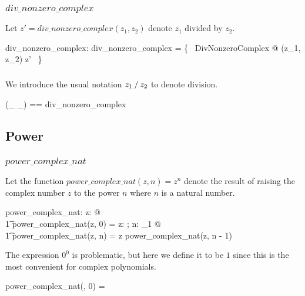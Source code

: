 \documentclass[11pt, oneside]{article}
\begin{document}
\subsubsection{$div\_nonzero\_complex$}

Let $z' = div\_nonzero\_complex(z_1, z_2)$ denote $z_1$ divided by $z_2$.

\begin{axdef}
	div\_nonzero\_complex: \C \cross \Cnz \fun \C
\where
	div\_nonzero\_complex = \{~ DivNonzeroComplex @ (z_1, z_2) \mapsto z' ~\}
\end{axdef}

\subsubsection{}

We introduce the usual notation $z_1 \mathbin{/} z_2$ to denote division.

\begin{zed}
	(\_ \divCnz \_) == div\_nonzero\_complex
\end{zed}

\subsection{Power}

\subsubsection{$power\_complex\_nat$}

Let the function $power\_complex\_nat(z,n) = z^n$ denote the result of raising the complex number $z$
to the power $n$ where $n$ is a natural number.

\begin{axdef}
	power\_complex\_nat: \C \cross \nat \fun \C
\where
	\forall z: \C @ \\
	\t1	power\_complex\_nat(z, 0) = \oneC
\also
	\forall z: \C; n: \nat_1 @ \\
	\t1	power\_complex\_nat(z, n) = z \mulC power\_complex\_nat(z, n - 1)
\end{axdef}

\begin{remark}
The expression $0^0$ is problematic, but here we define it to be $1$ since this is the most convenient for
complex polynomials.

\begin{zed}
	power\_complex\_nat(\zeroC, 0) = \oneC
\end{zed}
\end{remark}
\end{document}
